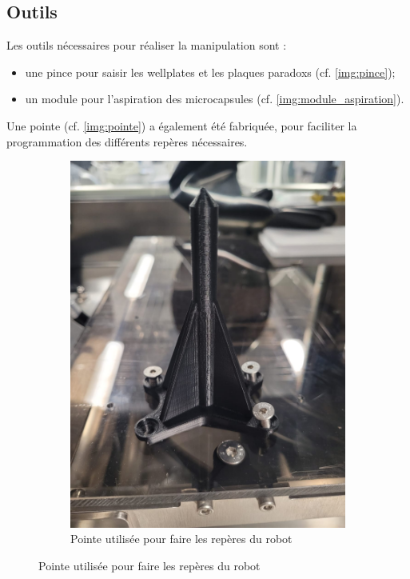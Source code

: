 \subsection{Outils}
Les outils nécessaires pour réaliser la manipulation sont :
\begin{itemize}
    \item une pince pour saisir les \glspl{wellplate} et les plaques \glspl{paradox} (cf. \autoref{img:pince});
    \item un module pour l'aspiration des \glspl{microcapsule} (cf. \autoref{img:module_aspiration}).
\end{itemize}
Une pointe (cf. \autoref{img:pointe}) a également été fabriquée, pour faciliter la programmation des différents repères nécessaires.
\begin{figure}[H]
    \centering
    \begin{subfigure}{0.4\textwidth}
        \includegraphics[width=\linewidth]{assets/figures/pointe.jpeg}
        \caption{Pointe utilisée pour faire les repères du robot}
        \label{img:pointe}
    \end{subfigure}


\end{figure}

